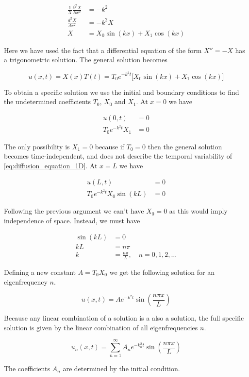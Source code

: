 \documentclass[12pt]{extarticle}
\begin{document}
\begin{align}
	\frac{1}{X} \frac{\partial^2 X}{\partial x^2} &= -k^2 \\
	\frac{d^2 X}{dx^2} &= -k^2 X \\
	X &= X_0 \sin(kx) + X_1 \cos(kx)
\end{align}

Here we have used the fact that a differential equation of the form $X'' = -X$ has a trigonometric solution. The general solution becomes

\[ u(x,t) = X(x)T(t) = T_0 e^{-k^2 t} \big[X_0\sin(kx) + X_1 \cos(kx)\big] \]

To obtain a specific solution we use the initial and boundary conditions to find the undetermined coefficients $T_0$, $X_0$ and $X_1$. At $x=0$ we have

\begin{align*}
	u(0,t) &= 0 \\
	T_0 e^{-k^2 t} X_1 &= 0 
\end{align*}

The only possibility is $X_1 = 0$ because if $T_0=0$ then the general solution becomes time-independent, and does not describe the temporal variability of  \eqref{eq:diffusion_equation_1D}. At $x=L$ we have

\begin{align*}
	u(L,t) &= 0 \\
	T_0 e^{-k^2 t} X_0 \sin(kL) &= 0
\end{align*}

Following the previous argument we can't have $X_0=0$ as this would imply independence of space. Instead, we must have 

\begin{align*}
	\sin(kL) &= 0 \\
	kL &= n\pi \\
	k &= \frac{n\pi}{L}, \quad n=0,1,2,\dots
\end{align*}

Defining a new constant $A=T_0 X_0$ we get the following solution for an eigenfrequency $n$.

\[ u(x,t) = A e^{-k^2t} \sin(\frac{n\pi x}{L}) \]

Because any linear combination of a solution is a also a solution, the full specific solution is given by the linear combination of all eigenfrequencies $n$.

\[ u_n(x,t) = \sum_{n=1}^{\infty} A_n e^{-k_n^2 t} \sin(\frac{n\pi x}{L}) \]

The coefficients $A_n$ are determined by the initial condition.
\end{document}
